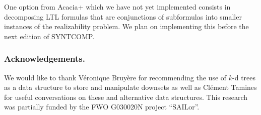 \documentclass[runningheads,a4paper]{llncs}
\begin{document}
One option from Acacia+ which we have not yet implemented consists in
decomposing LTL formulas that are conjunctions of subformulas into smaller
instances of the realizability problem. We plan on implementing this before
the next edition of SYNTCOMP.

\subsubsection*{Acknowledgements.}
We would like to thank V\'eronique Bruy\`ere for recommending the use of
\(k\)-d trees as a data structure to store and manipulate downsets as well as
Cl\'ement Tamines for useful conversations on these and alternative data
structures.
This research was partially funded by the FWO G030020N project ``SAILor''.



\end{document}
